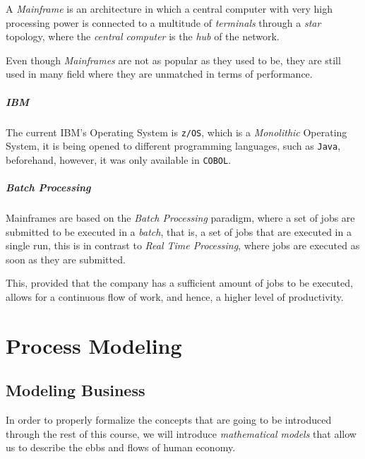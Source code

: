 \documentclass[openright, twoside, twocolumn]{report}
\begin{document}
    \begin{definition}
      \label{def:mainf}
      A \emph{Mainframe} is an architecture in which a central computer with very high
      processing power is connected to a multitude of \emph{terminals} through a
      \emph{star} topology, where the \emph{central computer} is the \emph{hub} of the
      network.
    \end{definition}

    Even though \emph{Mainframes} are not as popular as they used to be, they are still used in many
    field where they are unmatched in terms of performance.

    \paragraph{IBM}

    The current IBM's Operating System is \texttt{z/OS}, which is a \emph{Monolithic} Operating System,
    it is being opened to different programming languages, such as \texttt{Java}, beforehand, however,
    it was only available in \texttt{COBOL}.

    \paragraph{Batch Processing}

    Mainframes are based on the \emph{Batch Processing} paradigm, where a set of jobs are submitted to
    be executed in a \emph{batch}, that is, a set of jobs that are executed in a single run, this is
    in contrast to \emph{Real Time Processing}, where jobs are executed as soon as they are submitted.

    This, provided that the company has a sufficient amount of jobs to be executed, allows for a continuous
    flow of work, and hence, a higher level of productivity.

    \chapter{Process Modeling}

    \section{Modeling Business}

    In order to properly formalize the concepts that are going to be introduced through the rest
    of this course, we will introduce \emph{mathematical models} that allow us to describe the
    ebbs and flows of human economy.
\end{document}
